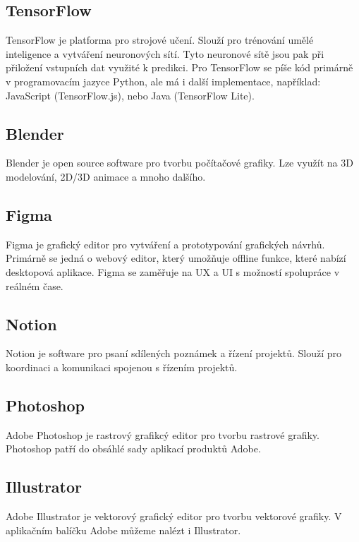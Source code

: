 \subsection{TensorFlow}
TensorFlow je platforma pro strojové učení. Slouží pro trénování umělé inteligence a vytváření neuronových sítí. Tyto neuronové sítě jsou pak při přiložení vstupních dat využité k predikci. Pro TensorFlow se píše kód primárně v programovacím jazyce Python, ale má i další implementace, například: JavaScript (TensorFlow.js), nebo Java (TensorFlow Lite).

\subsection{Blender}
Blender je open source software pro tvorbu počítačové grafiky. Lze využít na 3D modelování, 2D/3D animace a mnoho dalšího.

\subsection{Figma}
Figma je grafický editor pro vytváření a prototypování grafických návrhů. Primárně se jedná o webový editor, který umožňuje offline funkce, které nabízí desktopová aplikace. Figma se zaměřuje na UX a UI s možností spolupráce v reálném čase.

\subsection{Notion}
Notion je software pro psaní sdílených poznámek a řízení projektů. Slouží pro koordinaci a komunikaci spojenou s řízením projektů. 

\subsection{Photoshop}
Adobe Photoshop je rastrový grafikcý editor pro tvorbu rastrové grafiky. Photoshop patří do obsáhlé sady aplikací produktů Adobe.

\subsection{Illustrator}
Adobe Illustrator je vektorový grafický editor pro tvorbu vektorové grafiky. V aplikačním balíčku Adobe můžeme nalézt i Illustrator.
